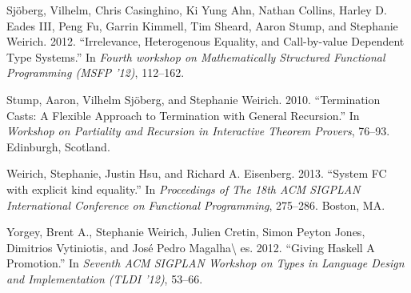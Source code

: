 \documentclass[]{article}
\begin{document}
Sjöberg, Vilhelm, Chris Casinghino, Ki Yung Ahn, Nathan Collins, Harley
D. Eades III, Peng Fu, Garrin Kimmell, Tim Sheard, Aaron Stump, and
Stephanie Weirich. 2012. ``Irrelevance, Heterogenous Equality, and
Call-by-value Dependent Type Systems.'' In \emph{Fourth workshop on
Mathematically Structured Functional Programming (MSFP '12)}, 112--162.

Stump, Aaron, Vilhelm Sjöberg, and Stephanie Weirich. 2010.
``Termination Casts: A Flexible Approach to Termination with General
Recursion.'' In \emph{Workshop on Partiality and Recursion in
Interactive Theorem Provers}, 76--93. Edinburgh, Scotland.

Weirich, Stephanie, Justin Hsu, and Richard A. Eisenberg. 2013. ``System
FC with explicit kind equality.'' In \emph{Proceedings of The 18th ACM
SIGPLAN International Conference on Functional Programming}, 275--286.
Boston, MA.

Yorgey, Brent A., Stephanie Weirich, Julien Cretin, Simon Peyton Jones,
Dimitrios Vytiniotis, and José Pedro Magalha\textbackslash{} es. 2012.
``Giving Haskell A Promotion.'' In \emph{Seventh ACM SIGPLAN Workshop on
Types in Language Design and Implementation (TLDI '12)}, 53--66.
\end{document}
